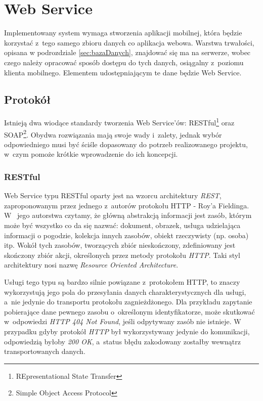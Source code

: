 \documentclass[11pt]{aghdpl}
\begin{document}
\section{Web Service}

Implementowany system wymaga stworzenia aplikacji mobilnej, która będzie korzystać z~tego samego zbioru danych co aplikacja webowa. Warstwa trwałości, opisana w podrozdziale \ref{sec:bazaDanych}, znajdować się ma na serwerze, wobec czego należy opracować sposób dostępu do tych danych, osiągalny z~poziomu klienta mobilnego. Elementem udostępniającym te dane będzie Web Service.

\subsection{Protokół}

Istnieją dwa wiodące standardy tworzenia Web Service'ów: RESTful\footnote{REpresentational State Transfer} oraz SOAP\footnote{Simple Object Access Protocol}. Obydwa rozwiązania mają swoje wady i~zalety, jednak wybór odpowiedniego musi być ściśle dopasowany do potrzeb realizowanego projektu, w~czym pomoże krótkie wprowadzenie do ich koncepcji.

\subsubsection{RESTful}

Web Service typu RESTful oparty jest na wzorcu architektury \emph{REST}, zaproponowanym przez jednego z~autorów protokołu HTTP - Roy'a Fieldinga. W~\cite{RFD} jego autorstwa czytamy, że główną abstrakcją informacji jest zasób, którym może być wszystko co da się nazwać: dokument, obrazek, usługa udzielająca informacji o pogodzie, kolekcja innych zasobów, obiekt rzeczywisty (np. osoba) itp. Wokół tych zasobów, tworzących zbiór nieskończony, zdefiniowany jest skończony zbiór akcji, określonych przez metody protokołu \emph{HTTP}. Taki styl architektury nosi nazwę \emph{Resource Oriented Architecture}.

Usługi tego typu są bardzo silnie powiązane z~protokołem HTTP, to znaczy wykorzystują jego pola do przesyłania danych charakterystycznych dla usługi, a~nie jedynie do transportu protokołu zagnieżdżonego. Dla przykładu zapytanie pobierające dane pewnego zasobu o~określonym identyfikatorze, może skutkować w~odpowiedzi \emph{HTTP 404 Not Found}, jeśli odpytywany zasób nie istnieje. W przypadku gdyby protokół \emph{HTTP} był wykorzystywany jedynie do komunikacji, odpowiedzią byłoby \emph{200 OK}, a~status błędu zakodowany zostałby wewnątrz transportowanych danych.
\end{document}

